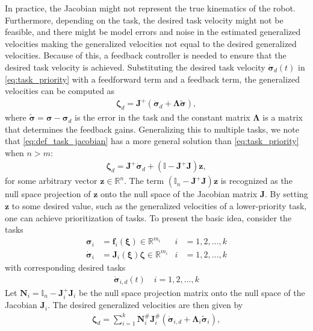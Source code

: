 In practice, the Jacobian might not represent the true kinematics of the robot.
Furthermore, depending on the task, the desired task velocity might not be feasible,
and there might be model errors and noise in the estimated generalized velocities making
the generalized velocities not equal to the desired generalized velocities. Because of this,
a feedback controller is needed to ensure that the desired task velocity is
achieved. Substituting the desired task velocity \(\dot{\bm{\sigma}}_d(t)\) in 
\autoref{eq:task_priority} with
a feedforward term and a feedback term, the generalized velocities can be computed as
\begin{align}
    \bm{\zeta}_d = \bm{J}^{+} \left(\dot{\bm{\sigma}}_d + \bm{\Lambda}\tilde{\bm{\sigma}}\right),
\end{align}
where $\tilde{\bm{\sigma}} = \bm{\sigma} - \bm{\sigma}_d$ is the error in the
task and the constant matrix $\bm{\Lambda}$ is a matrix that determines the
feedback gains.
Generalizing this to multiple tasks, we note that \autoref{eq:def_task_jacobian}
has a more general solution than \autoref{eq:task_priority} when $n > m$:
\begin{align}
    \bm{\zeta}_d = \bm{J}^{+} \dot{\bm{\sigma}}_d + (\mathbb{I} - \bm{J}^{+} \bm{J}) \bm{z},
\end{align}
for some arbitrary vector $\bm{z} \in \mathbb{R}^n$. The term
$(\mathbb{I}_n - \bm{J}^{+} \bm{J}) \bm{z}$ is recognized as the null space projection
of $\bm{z}$ onto the null space of the Jacobian matrix $\bm{J}$. By setting
$\bm{z}$ to some desired value, such as the generalized velocities of a lower-priority task,
one can achieve prioritization of tasks. To present the basic idea, consider the
tasks
\begin{subequations}
\begin{align}
    \bm{\sigma}_i &= \bm{f}_i(\bm{\xi}) \in \mathbb{R}^{m_i} &i &= 1, 2, \ldots, k \\
    \dot{\bm{\sigma}}_i &= \bm{J}_i(\bm{\xi}) \bm{\zeta} \in \mathbb{R}^{m_i} &i &= 1, 2, \ldots, k
\end{align}
\end{subequations}
with corresponding desired tasks
\begin{align}
    \dot{\bm{\sigma}}_{i,d}(t) \quad i = 1, 2, \ldots, k
\end{align}
Let $\bm{N}_i = \mathbb{I}_n - \bm{J}_i^{+} \bm{J}_i$ be the null space projection
matrix onto the null space of the Jacobian $\bm{J}_i$.
The desired generalized velocities are then given by
\begin{align}
    \bm{\zeta}_d = \sum_{i=1}^k \bm{N}_i^{\#}\bm{J}_i^{\#} \left(\dot{\bm{\sigma}}_{i,d} + \bm{\Lambda}_i \tilde{\bm{\sigma}}_i\right), \label{eq:task_priority_vel}
\end{align}
